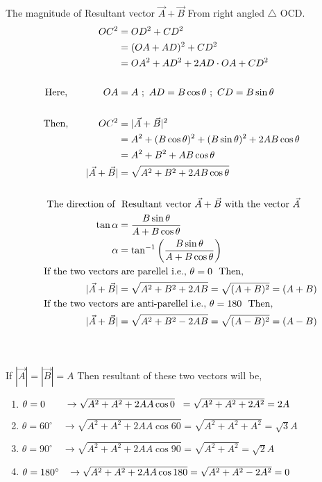 \begin{itemize}
The magnitude of Resultant vector ${\vec{A }+\vec{B}}$
From right angled $\triangle$ OCD.
\begin{align*}
O C^{2}&=O D^{2}+C D^{2}\\
&=(O A+AD)^{2}+C D^{2}\\
&=O A^{2}+A D^{2}+2AD\cdot OA +C D^{2}\\\\
\text{Here,}\hspace{1.3cm} O A&= A\ ; \ AD=B\cos\theta \ ; \ CD= B\sin\theta\\\\
\text{Then,}\hspace{1.1cm}  O C^{2}&=|\vec{A }+\vec{B}|^{2}\\&=A^{2}+(B\cos\theta)^{2}+(B\sin\theta)^{2}+2AB\cos\theta\\&=A^{2}+B^{2}+AB\cos\theta\\
|\vec{A }+\vec{B}|&=\sqrt{A^{2}+B^{2}+2AB\cos\theta}\\
\\
\text{The direction of }&\text{ Resultant vector}\ {\vec{A }+\vec{B}} \ \text{with the vector}  \ {\vec{A}}\\
\tan \alpha&=\frac{B \sin \theta}{A+B \cos \theta}\\
\alpha&=\tan ^{-1}\left(\frac{B \sin \theta}{A+B \cos \theta}\right)\\
\text{If the  two vectors}&\text{   are parellel i.e., $\theta=0$ \ Then,  }\ \\
|\vec{A }+\vec{B}|&=\sqrt{A^{2}+B^{2}+2AB}=\sqrt{(A+B)^{2}}=(A+B)\\
\text{If the  two vectors}&\text{   are anti-parellel i.e., $\theta=180$ \ Then,  }\ \\
|\vec{A }+\vec{B}|&=\sqrt{A^{2}+B^{2}-2AB}=\sqrt{(A-B)^{2}}=(A-B)\\
\end{align*}
\end{itemize}
\begin{note}
	\leavevmode
	\\\\
     	If $|\vec{A}|=|\vec{B}|=A$ Then resultant of these two vectors will be,
	\begin{enumerate}
		\item $\theta=0\qquad \rightarrow \sqrt{A^{2}+A^{2}+2A A\cos 0} \hspace{0.2cm}=\sqrt{A^{2}+A^{2}+2A^{2}}=2A $ 
		\item $\theta=60^{\circ} \quad\rightarrow \sqrt{A^{2}+A^{2}+2A A\cos 60}=\sqrt{A^{2}+A^{2}+A^{2}} =\sqrt{3}A $
		\item $\theta=90^{\circ}\quad\rightarrow \sqrt{A^{2}+A^{2}+2A A\cos 90}=\sqrt{A^{2}+A^{2}}=\sqrt{2} A $
			\item $\theta=180^{\circ} \hspace{0.3cm} \rightarrow \sqrt{A^{2}+A^{2}+2A A\cos 180}=\sqrt{A^{2}+A^{2}-2A^{2}} =0 $ 
	\end{enumerate}
\end{note}

